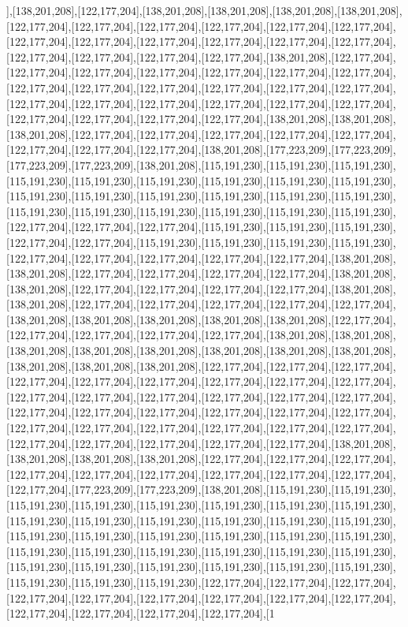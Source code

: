 ],[138,201,208],[122,177,204],[138,201,208],[138,201,208],[138,201,208],[138,201,208],[122,177,204],[122,177,204],[122,177,204],[122,177,204],[122,177,204],[122,177,204],[122,177,204],[122,177,204],[122,177,204],[122,177,204],[122,177,204],[122,177,204],[122,177,204],[122,177,204],[122,177,204],[122,177,204],[138,201,208],[122,177,204],[122,177,204],[122,177,204],[122,177,204],[122,177,204],[122,177,204],[122,177,204],[122,177,204],[122,177,204],[122,177,204],[122,177,204],[122,177,204],[122,177,204],[122,177,204],[122,177,204],[122,177,204],[122,177,204],[122,177,204],[122,177,204],[122,177,204],[122,177,204],[122,177,204],[122,177,204],[138,201,208],[138,201,208],[138,201,208],[122,177,204],[122,177,204],[122,177,204],[122,177,204],[122,177,204],[122,177,204],[122,177,204],[122,177,204],[138,201,208],[177,223,209],[177,223,209],[177,223,209],[177,223,209],[138,201,208],[115,191,230],[115,191,230],[115,191,230],[115,191,230],[115,191,230],[115,191,230],[115,191,230],[115,191,230],[115,191,230],[115,191,230],[115,191,230],[115,191,230],[115,191,230],[115,191,230],[115,191,230],[115,191,230],[115,191,230],[115,191,230],[115,191,230],[115,191,230],[115,191,230],[122,177,204],[122,177,204],[122,177,204],[115,191,230],[115,191,230],[115,191,230],[122,177,204],[122,177,204],[115,191,230],[115,191,230],[115,191,230],[115,191,230],[122,177,204],[122,177,204],[122,177,204],[122,177,204],[122,177,204],[138,201,208],[138,201,208],[122,177,204],[122,177,204],[122,177,204],[122,177,204],[138,201,208],[138,201,208],[122,177,204],[122,177,204],[122,177,204],[122,177,204],[138,201,208],[138,201,208],[122,177,204],[122,177,204],[122,177,204],[122,177,204],[122,177,204],[138,201,208],[138,201,208],[138,201,208],[138,201,208],[138,201,208],[122,177,204],[122,177,204],[122,177,204],[122,177,204],[122,177,204],[138,201,208],[138,201,208],[138,201,208],[138,201,208],[138,201,208],[138,201,208],[138,201,208],[138,201,208],[138,201,208],[138,201,208],[138,201,208],[122,177,204],[122,177,204],[122,177,204],[122,177,204],[122,177,204],[122,177,204],[122,177,204],[122,177,204],[122,177,204],[122,177,204],[122,177,204],[122,177,204],[122,177,204],[122,177,204],[122,177,204],[122,177,204],[122,177,204],[122,177,204],[122,177,204],[122,177,204],[122,177,204],[122,177,204],[122,177,204],[122,177,204],[122,177,204],[122,177,204],[122,177,204],[122,177,204],[122,177,204],[122,177,204],[122,177,204],[122,177,204],[138,201,208],[138,201,208],[138,201,208],[138,201,208],[122,177,204],[122,177,204],[122,177,204],[122,177,204],[122,177,204],[122,177,204],[122,177,204],[122,177,204],[122,177,204],[122,177,204],[177,223,209],[177,223,209],[138,201,208],[115,191,230],[115,191,230],[115,191,230],[115,191,230],[115,191,230],[115,191,230],[115,191,230],[115,191,230],[115,191,230],[115,191,230],[115,191,230],[115,191,230],[115,191,230],[115,191,230],[115,191,230],[115,191,230],[115,191,230],[115,191,230],[115,191,230],[115,191,230],[115,191,230],[115,191,230],[115,191,230],[115,191,230],[115,191,230],[115,191,230],[115,191,230],[115,191,230],[115,191,230],[115,191,230],[115,191,230],[115,191,230],[115,191,230],[115,191,230],[115,191,230],[122,177,204],[122,177,204],[122,177,204],[122,177,204],[122,177,204],[122,177,204],[122,177,204],[122,177,204],[122,177,204],[122,177,204],[122,177,204],[122,177,204],[122,177,204],[1